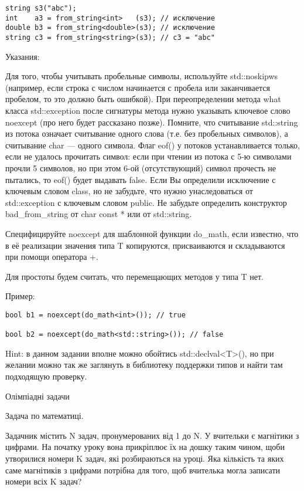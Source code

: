\documentclass[]{article}
\begin{document}
\begin{enumerate}
\begin{verbatim}
string s3("abc");
int    a3 = from_string<int>   (s3); // исключение
double b3 = from_string<double>(s3); // исключение
string c3 = from_string<string>(s3); // c3 = "abc"
\end{verbatim}

Указания:

    Для того, чтобы учитывать пробельные символы, используйте std::noskipws (например, если строка с числом начинается с пробела или заканчивается пробелом, то это должно быть ошибкой).
    При переопределении метода what класса std::exception после сигнатуры метода нужно указывать ключевое слово noexcept (про него будет рассказано позже).
    Помните, что считывание std::string из потока означает считывание одного слова (т.е. без пробельных символов), а считывание char — одного символа.
    Флаг eof() у потоков устанавливается только, если не удалось прочитать символ: если при чтении из потока с 5-ю символами прочли 5 символов, но при этом 6-ой (отсутствующий) символ прочесть не пытались, то eof() будет выдавать false.
    Если Вы определили исключение с ключевым словом class, но не забудьте, что нужно унаследоваться от std::exception с ключевым словом public.
    Не забудьте определить конструктор bad\_from\_string от char const * или от std::string.



Специфицируйте noexcept для шаблонной функции do\_math, если известно, что в её реализации значения типа T копируются,  присваиваются и складываются при помощи оператора +.

Для простоты будем считать, что перемещающих методов у типа T нет.

Пример:
\begin{verbatim}
bool b1 = noexcept(do_math<int>()); // true

bool b2 = noexcept(do_math<std::string>()); // false
\end{verbatim}

Hint: в данном задании вполне можно обойтись std::declval<T>(), но при желании можно так же заглянуть в библиотеку поддержки типов и найти там подходящую проверку.


Олімпіадні задачи

Задача по математиці.

Задачник містить N задач, пронумерованих від 1 до N. У вчительки є
магнітики з цифрами. На початку уроку вона прикріплює їх на дошку таким
чином, щоби утворилися номери K задач, які розбираються на уроці. Яка
кількість та яких саме магнітиків з цифрами потрібна для того, щоб
вчителька могла записати номери всіх K задач?


\end{enumerate}
\end{document}
